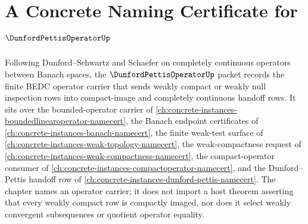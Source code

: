 \chapter{A Concrete Naming Certificate for $\DunfordPettisOperatorUp$}
\label{ch:concrete-instances-dunford-pettis-operator-namecert}

Following Dunford--Schwartz and Schaefer on completely continuous operators between Banach spaces, the $\DunfordPettisOperatorUp$ packet records the finite BEDC operator carrier that sends weakly compact or weakly null inspection rows into compact-image and completely continuous handoff rows. It sits over the bounded-operator carrier of \autoref{ch:concrete-instances-boundedlinearoperator-namecert}, the Banach endpoint certificates of \autoref{ch:concrete-instances-banach-namecert}, the finite weak-test surface of \autoref{ch:concrete-instances-weak-topology-namecert}, the weak-compactness request of \autoref{ch:concrete-instances-weak-compactness-namecert}, the compact-operator consumer of \autoref{ch:concrete-instances-compactoperator-namecert}, and the Dunford--Pettis handoff row of \autoref{ch:concrete-instances-dunford-pettis-namecert}. The chapter names an operator carrier; it does not import a host theorem asserting that every weakly compact row is compactly imaged, nor does it select weakly convergent subsequences or quotient operator equality.

